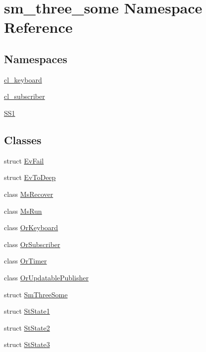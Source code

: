 \hypertarget{namespacesm__three__some}{}\section{sm\+\_\+three\+\_\+some Namespace Reference}
\label{namespacesm__three__some}
\subsection*{Namespaces}
\begin{DoxyCompactItemize}
\item 
 \hyperlink{namespacesm__three__some_1_1cl__keyboard}{cl\+\_\+keyboard}
\item 
 \hyperlink{namespacesm__three__some_1_1cl__subscriber}{cl\+\_\+subscriber}
\item 
 \hyperlink{namespacesm__three__some_1_1SS1}{S\+S1}
\end{DoxyCompactItemize}
\subsection*{Classes}
\begin{DoxyCompactItemize}
\item 
struct \hyperlink{structsm__three__some_1_1EvFail}{Ev\+Fail}
\item 
struct \hyperlink{structsm__three__some_1_1EvToDeep}{Ev\+To\+Deep}
\item 
class \hyperlink{classsm__three__some_1_1MsRecover}{Ms\+Recover}
\item 
class \hyperlink{classsm__three__some_1_1MsRun}{Ms\+Run}
\item 
class \hyperlink{classsm__three__some_1_1OrKeyboard}{Or\+Keyboard}
\item 
class \hyperlink{classsm__three__some_1_1OrSubscriber}{Or\+Subscriber}
\item 
class \hyperlink{classsm__three__some_1_1OrTimer}{Or\+Timer}
\item 
class \hyperlink{classsm__three__some_1_1OrUpdatablePublisher}{Or\+Updatable\+Publisher}
\item 
struct \hyperlink{structsm__three__some_1_1SmThreeSome}{Sm\+Three\+Some}
\item 
struct \hyperlink{structsm__three__some_1_1StState1}{St\+State1}
\item 
struct \hyperlink{structsm__three__some_1_1StState2}{St\+State2}
\item 
struct \hyperlink{structsm__three__some_1_1StState3}{St\+State3}
\end{DoxyCompactItemize}
